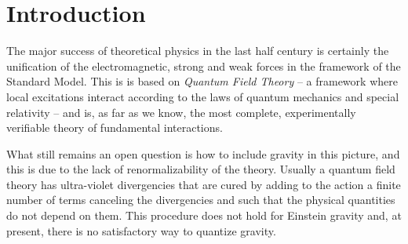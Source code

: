 \documentclass[draft]{phd}
\begin{document}
	\chapter*{Introduction}
The major success of theoretical physics in the last half century is certainly the unification of the electromagnetic, strong and weak forces in the framework of the Standard Model.
This is is based on \emph{Quantum Field Theory} -- a framework where local excitations interact according to the laws of quantum mechanics and special relativity -- and is, 
as far as we know, the most complete, experimentally verifiable theory of fundamental interactions. 
%
	
What still remains an open question is how to include gravity in this picture, and this is due to the lack of renormalizability of the theory. 
%		
Usually a quantum field theory has ultra-violet divergencies that are cured by adding to the action a finite number of terms canceling the divergencies and such that the physical quantities do not depend on them. 
This procedure does not hold for Einstein gravity and, at present, there is no 
%
satisfactory way to quantize gravity.
\end{document}
